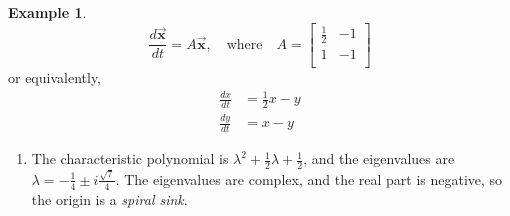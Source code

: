 \documentclass[reqno]{immbook}
\newcommand{\BX}{\vec{\textbf{x}}}
\numberwithin{equation}{chapter}
\numberwithin{question}{section}
\numberwithin{theorem}{chapter}
\numberwithin{figure}{chapter}
\theoremstyle{definition}
\newtheorem{example}{Example}[section]
\begin{document}
\begin{example}
\[
  \frac{d\BX}{dt} = A \BX, \quad \textrm{where} \quad
    A = \begin{bmatrix}
                   \frac{1}{2} & -1 \\
		   1 & -1 \\
        \end{bmatrix}
\]
or equivalently,
\[
\begin{split}
   \frac{dx}{dt} & = \frac{1}{2} x - y \\
   \frac{dy}{dt} & = x - y
\end{split}
\]
\begin{enumerate}
\item
The characteristic polynomial is $\lambda^2 +\frac{1}{2}\lambda+\frac{1}{2}$,
and the eigenvalues are
$\lambda = -\frac{1}{4}\pm i \frac{\sqrt{7}}{4}$.
The eigenvalues are complex,
and the real part is negative,
so the origin is a \emph{spiral sink}.


\end{enumerate}
\end{example}
\end{document}
